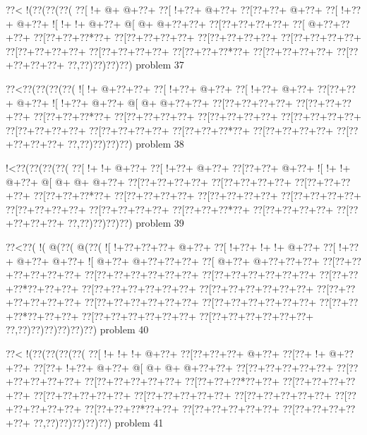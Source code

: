 \vbox{\vbox{\goo
\0??<\- !(\0??(\0??(\0??(
\0??[\- !+\- @+\- @+\0??+
\0??[\- !+\0??+\- @+\0??+
\0??[\0??+\0??+\- @+\0??+
\0??[\- !+\0??+\- @+\0??+
\- ![\- !+\- !+\- @+\0??+
\- @[\- @+\- @+\0??+\0??+
\0??[\0??+\0??+\0??+\0??+
\0??[\- @+\0??+\0??+\0??+
\0??[\0??+\0??+\0??*\0??+
\0??[\0??+\0??+\0??+\0??+
\0??[\0??+\0??+\0??+\0??+
\0??[\0??+\0??+\0??+\0??+
\0??[\0??+\0??+\0??+\0??+
\0??[\0??+\0??+\0??+\0??+
\0??[\0??+\0??+\0??*\0??+
\0??[\0??+\0??+\0??+\0??+
\0??[\0??+\0??+\0??+\0??+
\0??,\0??)\0??)\0??)\0??)
}
\hfil problem 37\hfil\break
}

\vbox{\vbox{\goo
\0??<\0??(\0??(\0??(\0??(
\- ![\- !+\- @+\0??+\0??+
\0??[\- !+\0??+\- @+\0??+
\0??[\- !+\0??+\- @+\0??+
\0??[\0??+\0??+\- @+\0??+
\- ![\- !+\0??+\- @+\0??+
\- @[\- @+\- @+\0??+\0??+
\0??[\0??+\0??+\0??+\0??+
\0??[\0??+\0??+\0??+\0??+
\0??[\0??+\0??+\0??*\0??+
\0??[\0??+\0??+\0??+\0??+
\0??[\0??+\0??+\0??+\0??+
\0??[\0??+\0??+\0??+\0??+
\0??[\0??+\0??+\0??+\0??+
\0??[\0??+\0??+\0??+\0??+
\0??[\0??+\0??+\0??*\0??+
\0??[\0??+\0??+\0??+\0??+
\0??[\0??+\0??+\0??+\0??+
\0??,\0??)\0??)\0??)\0??)
}
\hfil problem 38\hfil\break
}

\vbox{\vbox{\goo
\- !<\0??(\0??(\0??(\0??(
\0??[\- !+\- !+\- @+\0??+
\0??[\- !+\0??+\- @+\0??+
\0??[\0??+\0??+\- @+\0??+
\- ![\- !+\- !+\- @+\0??+
\- @[\- @+\- @+\- @+\0??+
\0??[\0??+\0??+\0??+\0??+
\0??[\0??+\0??+\0??+\0??+
\0??[\0??+\0??+\0??+\0??+
\0??[\0??+\0??+\0??*\0??+
\0??[\0??+\0??+\0??+\0??+
\0??[\0??+\0??+\0??+\0??+
\0??[\0??+\0??+\0??+\0??+
\0??[\0??+\0??+\0??+\0??+
\0??[\0??+\0??+\0??+\0??+
\0??[\0??+\0??+\0??*\0??+
\0??[\0??+\0??+\0??+\0??+
\0??[\0??+\0??+\0??+\0??+
\0??,\0??)\0??)\0??)\0??)
}
\hfil problem 39\hfil\break
}

\vbox{\vbox{\goo
\0??<\0??(\- !(\- @(\0??(\- @(\0??(
\- ![\- !+\0??+\0??+\0??+\- @+\0??+
\0??[\- !+\0??+\- !+\- !+\- @+\0??+
\0??[\- !+\0??+\- @+\0??+\- @+\0??+
\- ![\- @+\0??+\- @+\0??+\0??+\0??+
\0??[\- @+\0??+\- @+\0??+\0??+\0??+
\0??[\0??+\0??+\0??+\0??+\0??+\0??+
\0??[\0??+\0??+\0??+\0??+\0??+\0??+
\0??[\0??+\0??+\0??+\0??+\0??+\0??+
\0??[\0??+\0??+\0??*\0??+\0??+\0??+
\0??[\0??+\0??+\0??+\0??+\0??+\0??+
\0??[\0??+\0??+\0??+\0??+\0??+\0??+
\0??[\0??+\0??+\0??+\0??+\0??+\0??+
\0??[\0??+\0??+\0??+\0??+\0??+\0??+
\0??[\0??+\0??+\0??+\0??+\0??+\0??+
\0??[\0??+\0??+\0??*\0??+\0??+\0??+
\0??[\0??+\0??+\0??+\0??+\0??+\0??+
\0??[\0??+\0??+\0??+\0??+\0??+\0??+
\0??,\0??)\0??)\0??)\0??)\0??)\0??)
}
\hfil problem 40\hfil\break
}

\vbox{\vbox{\goo
\0??<\- !(\0??(\0??(\0??(\0??(
\0??[\- !+\- !+\- !+\- @+\0??+
\0??[\0??+\0??+\0??+\- @+\0??+
\0??[\0??+\- !+\- @+\0??+\0??+
\0??[\0??+\- !+\0??+\- @+\0??+
\- @[\- @+\- @+\- @+\0??+\0??+
\0??[\0??+\0??+\0??+\0??+\0??+
\0??[\0??+\0??+\0??+\0??+\0??+
\0??[\0??+\0??+\0??+\0??+\0??+
\0??[\0??+\0??+\0??*\0??+\0??+
\0??[\0??+\0??+\0??+\0??+\0??+
\0??[\0??+\0??+\0??+\0??+\0??+
\0??[\0??+\0??+\0??+\0??+\0??+
\0??[\0??+\0??+\0??+\0??+\0??+
\0??[\0??+\0??+\0??+\0??+\0??+
\0??[\0??+\0??+\0??*\0??+\0??+
\0??[\0??+\0??+\0??+\0??+\0??+
\0??[\0??+\0??+\0??+\0??+\0??+
\0??,\0??)\0??)\0??)\0??)\0??)
}
\hfil problem 41\hfil\break
}

